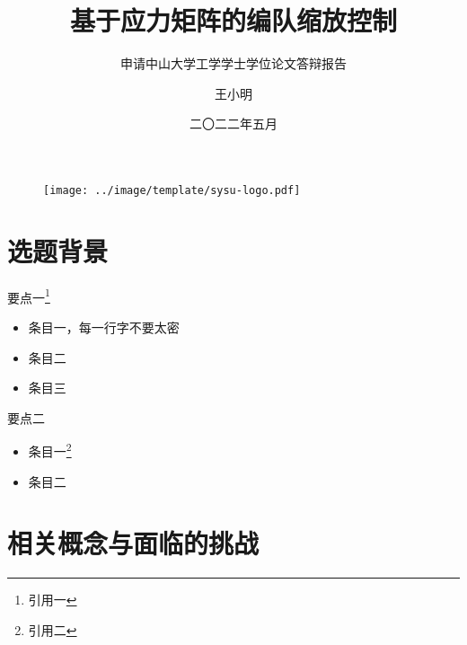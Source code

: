 \documentclass{sysupptthesis}
\author{王小明}
\title{基于应力矩阵的编队缩放控制\cite{2019Stress}}
\subtitle{申请中山大学工学学士学位论文答辩报告}
\institute{中山大学~计算机学院（软件学院）} %
\date{
    二〇二二年五月
}
\begin{document}
\begin{frame}
    \titlepage
    \vspace*{-0.5cm}
    \begin{figure}[htpb]
        \centering
        \texttt{[image: ../image/template/sysu-logo.pdf]}
    \end{figure}
\end{frame}

\begin{frame}
    \tableofcontents[sectionstyle=show,subsectionstyle=show/shaded/hide,subsubsectionstyle=show/shaded/hide]
\end{frame}

\section{选题背景}

\begin{frame}

    \begin{block}{要点一\footnote{引用一}}
        \begin{itemize}
            \item 条目一，每一行字不要太密
            \item 条目二
            \item 条目三
        \end{itemize}
    \end{block}

    \begin{block}{要点二}
        \begin{itemize}
            \item 条目一\footnote{引用二}
            \item 条目二
        \end{itemize}
    \end{block}

\end{frame}

\section{相关概念与面临的挑战}
\end{document}
